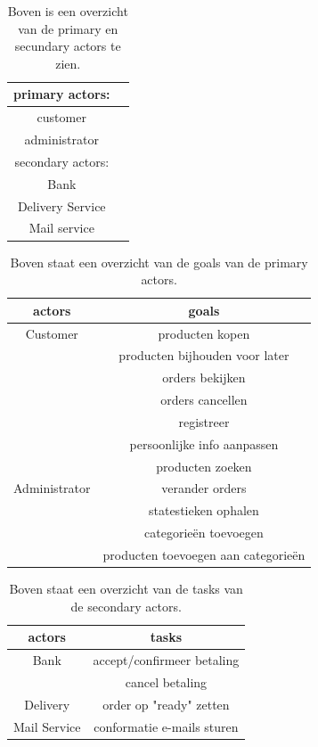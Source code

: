 \documentclass[•]{article}
\begin{document}
\begin{table}
\centering
\begin{tabular}{|c|c|}
\hline
primary actors: \\
\hline
customer \\
administrator\\
\hline
\hline
secondary actors: \\
\hline
Bank \\
Delivery Service\\
Mail service \\
\hline
\end{tabular}
\caption{Boven is een overzicht van de primary en secundary actors te zien.}
\label{tbl_actors}
\end{table}

\begin{table}
\centering
\begin{tabular}{|c|c|}
\hline
actors 		& goals\\
\hline
Customer 	& producten kopen\\
			& producten bijhouden voor later\\
			& orders bekijken\\
			& orders cancellen\\
			& registreer\\
			& persoonlijke info aanpassen\\
			& producten zoeken\\
\hline
Administrator 	& verander orders\\
				& statestieken ophalen\\
				& categorie\"en toevoegen\\
				& producten toevoegen aan categorie\"en\\
\hline
\end{tabular}
\caption{Boven staat een overzicht van de goals van de primary actors.}
\label{tbl_goals}
\end{table}

\begin{table}
\centering
\begin{tabular}{|c|c|}
\hline
actors 		& tasks\\
\hline
Bank 	& accept/confirmeer betaling \\
		& cancel betaling \\
\hline
Delivery	& order op "ready" zetten \\
\hline
Mail Service & conformatie e-mails sturen \\
\hline
\end{tabular}
\caption{Boven staat een overzicht van de tasks van de secondary actors.}
\label{tbl_tasks}
\end{table}
\end{document}
